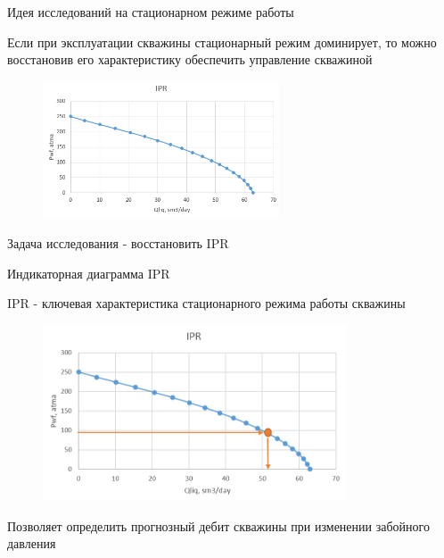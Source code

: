 \documentclass[aspectratio=169, 11pt]{beamer} %
\begin{document}
\begin{frame}{Идея исследований на стационарном режиме работы}

Если при эксплуатации скважины стационарный режим доминирует, то можно восстановив его характеристику обеспечить управление скважиной

\begin{figure}[h!]
	\begin{center}
		\includegraphics[width=7cm]{pics/ipr_1.png}
		\label{ris:ipr_1}
	\end{center}
\end{figure}

Задача исследования - восстановить IPR
	
\end{frame}
\begin{frame}{Индикаторная диаграмма IPR}
	
	IPR - ключевая характеристика стационарного режима работы скважины
	
	\begin{figure}[h!]
		\begin{center}
			\includegraphics[width=9cm]{pics/ipr_2.png}
			\label{ris:ipr_1}
		\end{center}
	\end{figure}
	
	Позволяет определить прогнозный дебит скважины при изменении забойного давления
	
\end{frame}
\end{document}
